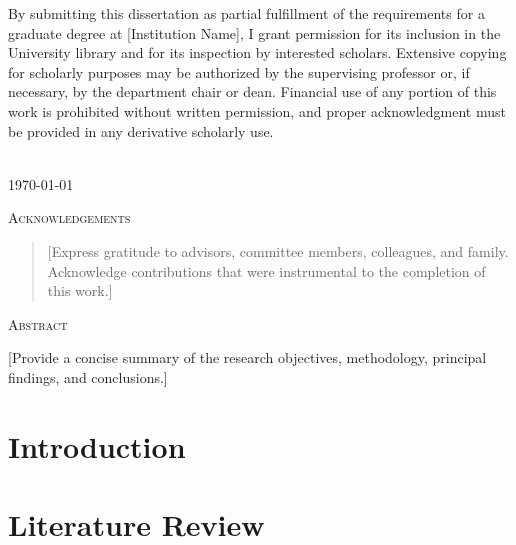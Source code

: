 \documentclass[12pt]{report}
\begin{document}
By submitting this dissertation as partial fulfillment of the requirements for a graduate degree at [Institution Name], I grant permission for its inclusion in the University library and for its inspection by interested scholars. Extensive copying for scholarly purposes may be authorized by the supervising professor or, if necessary, by the department chair or dean. Financial use of any portion of this work is prohibited without written permission, and proper acknowledgment must be provided in any derivative scholarly use.

\vspace{1in}
\begin{flushright}
    \\
    \today \\
\end{flushright}

\newpage
\begin{center}
    \textsc{\Large Acknowledgements}\\[1.5cm]
    \begin{quote}
        [Express gratitude to advisors, committee members, colleagues, and family. Acknowledge contributions that were instrumental to the completion of this work.]
    \end{quote}
\end{center}

\newpage
\tableofcontents
\listoffigures
{}
\listoftables
{}

\newpage
\begin{center}
    \textsc{\Large Abstract}\\[1.5cm]
\end{center}
[Provide a concise summary of the research objectives, methodology, principal findings, and conclusions.]

\clearpage
{}

\chapter{Introduction}


\chapter{Literature Review}
%
\end{document}
